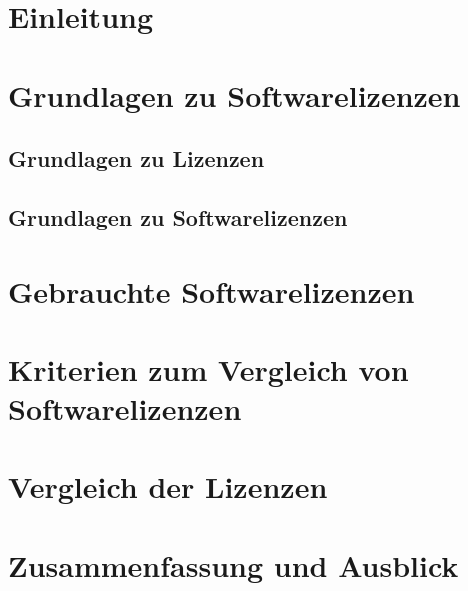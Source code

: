 %
\chapter{Einleitung}
\seChaptersWithoutNewpage{}

\seChapterEndSkip{}

\seChaptersNewpage{}

%
%

\chapter{Grundlagen zu Softwarelizenzen}
\section{Grundlagen zu Lizenzen}

\section{Grundlagen zu Softwarelizenzen}


\chapter{Gebrauchte Softwarelizenzen}


\chapter{Kriterien zum Vergleich von Softwarelizenzen}


\chapter{Vergleich der Lizenzen}


\chapter{Zusammenfassung und Ausblick}

